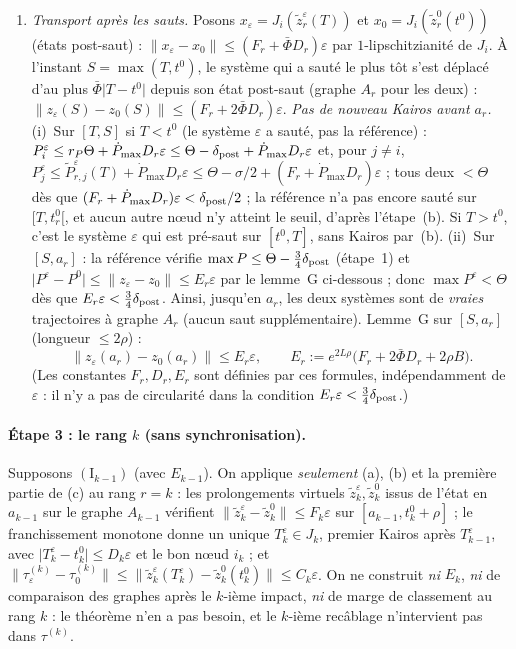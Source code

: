 \documentclass[11pt,a4paper]{article}
\theoremstyle{remark}
\theoremstyle{definition}
\newcommand{\norm}[1]{\lVert #1\rVert}
\newcommand{\eps}{\varepsilon}
\newcommand{\zt}{\widetilde z}
\newcommand{\Pt}{\widetilde P}
\begin{document}
\begin{enumerate}[label=(\alph*)]
\item \emph{Transport après les sauts.} Posons $x_\eps=J_i(\zt^\eps_r(T))$ et $x_0=J_i(\zt^0_r(t^0))$ (états post-saut) : $\norm{x_\eps-x_0}\le(F_r+\bar\Phi D_r)\eps$ par $1$-lipschitzianité de $J_i$. À l'instant $S=\max(T,t^0)$, le système qui a sauté le plus tôt s'est déplacé d'au plus $\bar\Phi\lvert T-t^0\rvert$ depuis son état post-saut (graphe $A_r$ pour les deux) : $\norm{z_\eps(S)-z_0(S)}\le(F_r+2\bar\Phi D_r)\eps$.
 \emph{Pas de nouveau Kairos avant $a_r$.} (i)~Sur $[T,S]$ si $T<t^0$ (le système $\eps$ a sauté, pas la référence) : $P^\eps_i\le r_P\Theta+\dot P_{\max}D_r\eps\le\Theta-\delta_{\rm post}+\dot P_{\max}D_r\eps$ et, pour $j\ne i$, $P^\eps_j\le\Pt^\eps_{r,j}(T)+\dot P_{\max}D_r\eps\le\Theta-\sigma/2+(F_r+\dot P_{\max}D_r)\eps$ ; tous deux $<\Theta$ dès que $(F_r+\dot P_{\max}D_r)\eps<\delta_{\rm post}/2$ ; la référence n'a pas encore sauté sur $[T,t_r^0[$, et aucun autre n\oe ud n'y atteint le seuil, d'après l'étape~(b). Si $T>t^0$, c'est le système $\eps$ qui est pré-saut sur $[t^0,T]$, sans Kairos par~(b). (ii)~Sur $[S,a_r]$ : la référence vérifie $\max P\le\Theta-\tfrac34\delta_{\rm post}$ (étape~1) et $\lvert P^\eps-P^0\rvert\le\norm{z_\eps-z_0}\le E_r\eps$ par le lemme~G ci-dessous ; donc $\max P^\eps<\Theta$ dès que $E_r\eps<\tfrac34\delta_{\rm post}$. Ainsi, jusqu'en $a_r$, les deux systèmes sont de \emph{vraies} trajectoires à graphe $A_r$ (aucun saut supplémentaire).
 Lemme~G sur $[S,a_r]$ (longueur $\le2\rho$) :
 \[
 \norm{z_\eps(a_r)-z_0(a_r)}\le E_r\eps,\qquad E_r:=e^{2L\rho}\bigl(F_r+2\bar\Phi D_r+2\rho B\bigr).
 \]
 (Les constantes $F_r,D_r,E_r$ sont définies par ces formules, indépendamment de $\eps$ : il n'y a pas de circularité dans la condition $E_r\eps<\tfrac34\delta_{\rm post}$.)
\end{enumerate}
\paragraph{Étape 3 : le rang $k$ (sans synchronisation).} Supposons $(\mathrm I_{k-1})$ (avec $E_{k-1}$). On applique \emph{seulement} (a), (b) et la première partie de (c) au rang $r=k$ : les prolongements virtuels $\zt^\eps_k,\zt^0_k$ issus de l'état en $a_{k-1}$ sur le graphe $A_{k-1}$ vérifient $\norm{\zt^\eps_k-\zt^0_k}\le F_k\eps$ sur $[a_{k-1},t_k^0+\rho]$ ; le franchissement monotone donne un unique $T_k^\eps\in J_k$, premier Kairos après $T_{k-1}^\eps$, avec $\lvert T_k^\eps-t_k^0\rvert\le D_k\eps$ et le bon n\oe ud $i_k$ ; et $\norm{\tau_\eps^{(k)}-\tau_0^{(k)}}\le\norm{\zt^\eps_k(T_k^\eps)-\zt^0_k(t_k^0)}\le C_k\eps$. On ne construit \emph{ni} $E_k$, \emph{ni} de comparaison des graphes après le $k$-ième impact, \emph{ni} de marge de classement au rang $k$ : le théorème n'en a pas besoin, et le $k$-ième recâblage n'intervient pas dans $\tau^{(k)}$.
\end{document}
